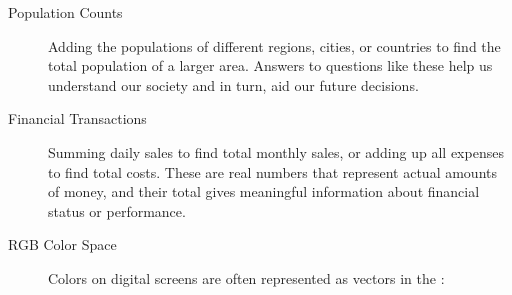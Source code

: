 \documentclass{ximera}
\begin{document}
\begin{concept}
\begin{description}
\item[Population Counts] Adding the populations of different regions,
  cities, or countries to find the total population of a larger
  area. Answers to questions like these help us understand our
  society and in turn, aid our future decisions.
\item[Financial Transactions] Summing daily sales to find total
  monthly sales, or adding up all expenses to find total costs. These
  are real numbers that represent actual amounts of money, and their
  total gives meaningful information about financial status or
  performance.
\item[RGB Color Space] Colors on digital screens are often represented
  as vectors in the :
  \begin{center}
\end{center}
\end{description}
\end{concept}
\end{document}
